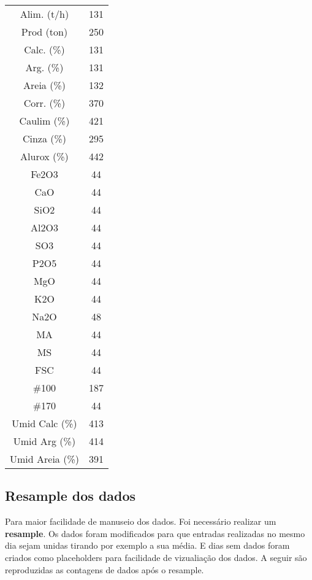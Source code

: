\newpage

\begin{center}
\begin{tabular}{ c c }
Alim. (t/h)       & 131\\
Prod (ton)        & 250\\
Calc. (\%)        & 131\\
Arg. (\%)         & 131\\
Areia (\%)        & 132\\
Corr. (\%)        & 370\\
Caulim (\%)       & 421\\
Cinza (\%)        & 295\\
Alurox (\%)       & 442\\
Fe2O3             & 44\\
CaO               & 44\\
SiO2              & 44\\
Al2O3             & 44\\
SO3               & 44\\
P2O5              & 44\\
MgO              &  44\\
K2O              &  44\\
Na2O             &  48\\
MA               &  44\\
MS               &  44\\
FSC              &  44\\
\#100             & 187\\
\#170             &  44\\
Umid Calc (\%)   &  413\\
Umid Arg (\%)    &  414 \\
Umid Areia (\%) &    391 \\
\end{tabular}
\end{center}




\subsection{Resample dos dados}
Para maior facilidade de manuseio dos dados. Foi necessário realizar um \textbf{resample}. Os dados foram modificados para que entradas realizadas no mesmo dia sejam unidas tirando por exemplo a sua média. E dias sem dados foram criados como placeholders para facilidade de vizualiação dos dados. A seguir são reproduzidas as contagens de dados após o resample.


